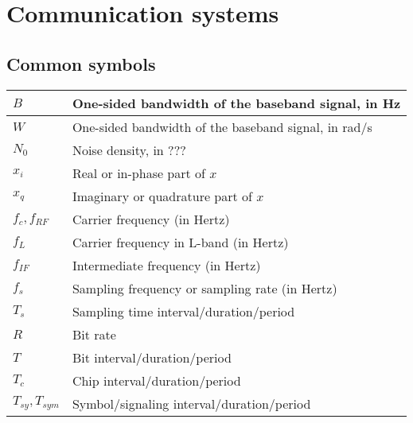 \section{Communication systems}
\subsection{Common symbols}
\begin{xltabular}{\textwidth}{XX}
	\(B\)                 & One-sided bandwidth of the baseband signal, in Hz                                 \\ \hline
	\(W\)                 & One-sided bandwidth of the baseband signal, in rad/s                              \\ \hline
	\(N_0\)               & Noise density, in ???                                                             \\ \hline
	\(x_i\)               & Real or in-phase part of \(x\)                                                    \\ \hline
	\(x_q\)               & Imaginary or quadrature part of \(x\)                                             \\ \hline
	\(f_c, f_{RF}\)       & Carrier frequency (in Hertz)                                                      \\ \hline
	\(f_L\)               & Carrier frequency in L-band (in Hertz)                                            \\ \hline
	\(f_{IF}\)            & Intermediate frequency (in Hertz)                                                 \\ \hline
	\(f_{s}\)             & Sampling frequency or sampling rate (in Hertz)                                    \\ \hline
	\(T_{s}\)             & Sampling time interval/duration/period                                            \\ \hline
	\(R\)                 & Bit rate                                                                          \\ \hline
	\(T\)                 & Bit interval/duration/period                                                      \\ \hline
	\(T_c\)               & Chip interval/duration/period                                                     \\ \hline
	\(T_{sy}, T_{sym}\)   & Symbol/signaling\cite{proakisDigitalCommunications2007} interval/duration/period  \\ \hline

\end{xltabular}
